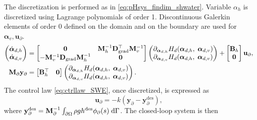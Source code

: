 The discretization is performed as in \eqref{eq:pHsys_findim_shwater}. Variable $\alpha_h$ is discretized using Lagrange polynomials of order 1. Discontinuous Galerkin elements of order 0 defined on the domain and on the boundary are used for $\bm{\alpha}_v, \bm{u}_\partial$.
\begin{equation}\label{eq:pHsys_findim_shwater_ctrl}
\begin{aligned}
\begin{pmatrix}
\dot{\bm{\alpha}}_{d, h} \\
\dot{\bm{\alpha}}_{d, v} \\
\end{pmatrix}
&= \begin{bmatrix}
\mathbf{0} &  \mathbf{M}_h^{-1} \mathbf{D}_{\operatorname*{grad}}^\top \mathbf{M}_v^{-1} \\
-\mathbf{M}_v^{-1} \mathbf{D}_{\operatorname*{grad}} \mathbf{M}_h^{-1} & \mathbf{0} \\
\end{bmatrix} 
\begin{pmatrix}
\partial_{\bm{\alpha}_{d, h}} H_d(\bm{\alpha}_{d, h},\; \bm{\alpha}_{d, v})\\
\partial_{\bm{\alpha}_{d, v}} H_d(\bm{\alpha}_{d, h},\; \bm{\alpha}_{d, v})\\
\end{pmatrix} + 
\begin{bmatrix}
\mathbf{B}_h \\
\mathbf{0}\\
\end{bmatrix}
\mathbf{u}_\partial, \\
\mathbf{M}_\partial {\mathbf{y}_\partial} &= \begin{bmatrix}
\mathbf{B}_h^\top & \mathbf{0}
\end{bmatrix}\begin{pmatrix}
\partial_{\bm{\alpha}_{d, h}} H_d(\bm{\alpha}_{d, h},\; \bm{\alpha}_{d, v})\\
\partial_{\bm{\alpha}_{d, v}} H_d(\bm{\alpha}_{d, h},\; \bm{\alpha}_{d, v})\\
\end{pmatrix}.
\end{aligned}
\end{equation}
The control law \eqref{eq:ctrllaw_SWE}, once discretized, is expressed as
\begin{equation}
	\mathbf{u}_\partial = -k (\mathbf{y}_\partial - \mathbf{y}_\partial^{\text{des}}),
\end{equation}
where $\mathbf{y}_\partial^{\text{des}} = \mathbf{M}_\partial^{-1}\int_{\partial\Omega} \rho g h^{\text{des}} \phi_\partial(s) \d\Gamma$. The closed-loop system is then
